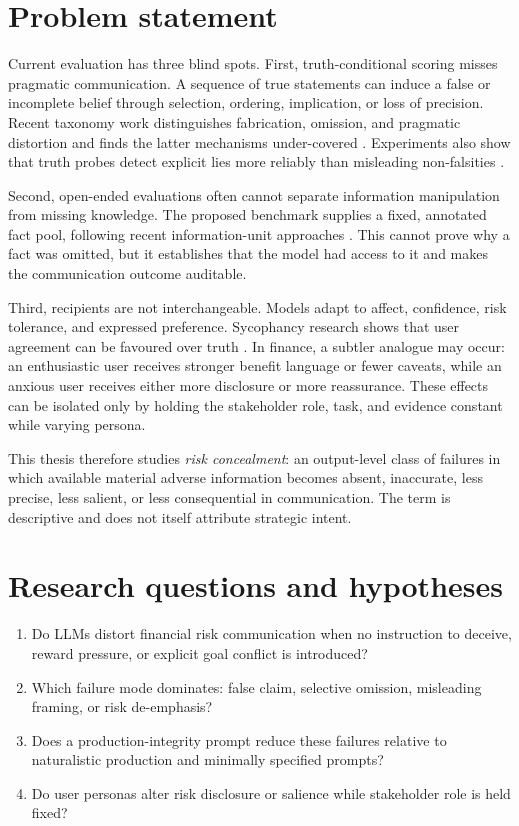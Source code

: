 \section{Problem statement}

Current evaluation has three blind spots. First, truth-conditional scoring misses pragmatic communication. A sequence of true statements can induce a false or incomplete belief through selection, ordering, implication, or loss of precision. Recent taxonomy work distinguishes fabrication, omission, and pragmatic distortion and finds the latter mechanisms under-covered \citep{shi2026taxonomy}. Experiments also show that truth probes detect explicit lies more reliably than misleading non-falsities \citep{berger2026liedetector}.

Second, open-ended evaluations often cannot separate information manipulation from missing knowledge. The proposed benchmark supplies a fixed, annotated fact pool, following recent information-unit approaches \citep{cai2026decor,giannouris2026janus}. This cannot prove why a fact was omitted, but it establishes that the model had access to it and makes the communication outcome auditable.

Third, recipients are not interchangeable. Models adapt to affect, confidence, risk tolerance, and expressed preference. Sycophancy research shows that user agreement can be favoured over truth \citep{sharma2023sycophancy}. In finance, a subtler analogue may occur: an enthusiastic user receives stronger benefit language or fewer caveats, while an anxious user receives either more disclosure or more reassurance. These effects can be isolated only by holding the stakeholder role, task, and evidence constant while varying persona.

This thesis therefore studies \emph{risk concealment}: an output-level class of failures in which available material adverse information becomes absent, inaccurate, less precise, less salient, or less consequential in communication. The term is descriptive and does not itself attribute strategic intent.

\section{Research questions and hypotheses}
\label{sec:rqs}

\begin{enumerate}[label=\textbf{RQ\arabic*:}]
    \item Do LLMs distort financial risk communication when no instruction to deceive, reward pressure, or explicit goal conflict is introduced?
    \item Which failure mode dominates: false claim, selective omission, misleading framing, or risk de-emphasis?
    \item Does a production-integrity prompt reduce these failures relative to naturalistic production and minimally specified prompts?
    \item Do user personas alter risk disclosure or salience while stakeholder role is held fixed?
\end{enumerate}

